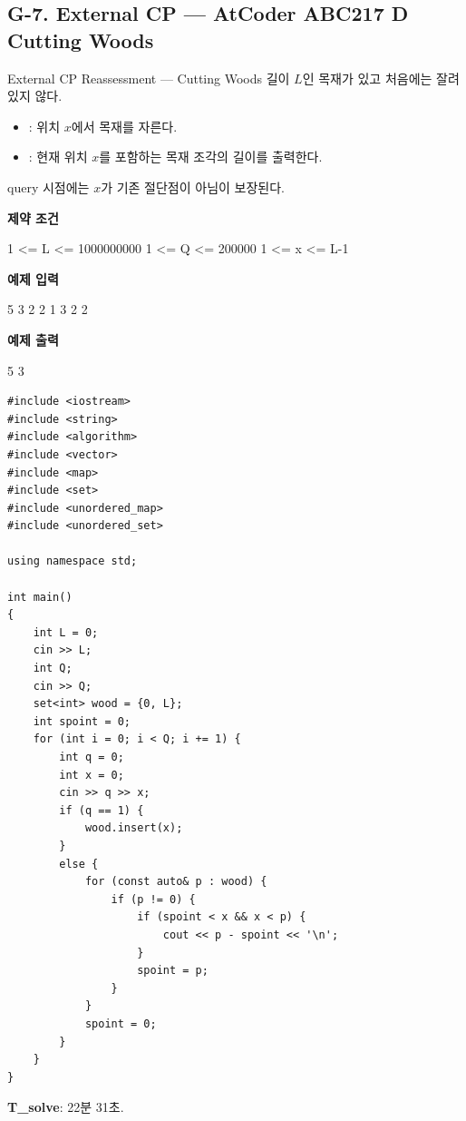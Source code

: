 \subsection{G-7. External CP --- AtCoder ABC217 D Cutting Woods}
\begin{problembox}{External CP Reassessment --- Cutting Woods}
길이 $L$인 목재가 있고 처음에는 잘려 있지 않다.
\begin{itemize}
\item {}: 위치 $x$에서 목재를 자른다.
\item {}: 현재 위치 $x$를 포함하는 목재 조각의 길이를 출력한다.
\end{itemize}
query 시점에는 $x$가 기존 절단점이 아님이 보장된다.

\textbf{제약 조건}
\begin{TextBlock}
1 <= L <= 1000000000
1 <= Q <= 200000
1 <= x <= L-1
\end{TextBlock}

\textbf{예제 입력}
\begin{TextBlock}
5 3
2 2
1 3
2 2
\end{TextBlock}

\textbf{예제 출력}
\begin{TextBlock}
5
3
\end{TextBlock}
\end{problembox}

\begin{answerbox}[학습자 제출 답안]
\begin{lstlisting}
#include <iostream>
#include <string>
#include <algorithm>
#include <vector>
#include <map>
#include <set>
#include <unordered_map>
#include <unordered_set>

using namespace std;

int main()
{
    int L = 0;
    cin >> L;
    int Q;
    cin >> Q;
    set<int> wood = {0, L};
    int spoint = 0;
    for (int i = 0; i < Q; i += 1) {
        int q = 0;
        int x = 0;
        cin >> q >> x;
        if (q == 1) {
            wood.insert(x);
        }
        else {
            for (const auto& p : wood) {
                if (p != 0) {
                    if (spoint < x && x < p) {
                        cout << p - spoint << '\n';
                    }
                    spoint = p;
                }
            }
            spoint = 0;
        }
    }
}
\end{lstlisting}

\textbf{T\_solve}: 22분 31초.
\end{answerbox}

